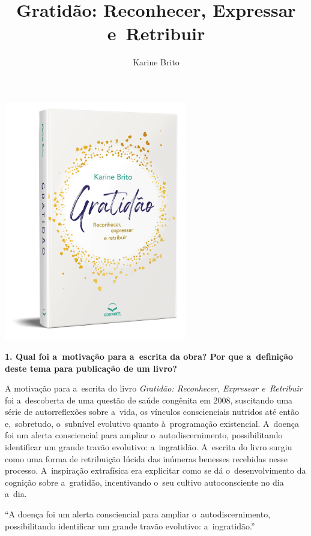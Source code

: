 \documentclass{gescons}
\author{Karine Brito}
\title{Gratidão: Reconhecer, Expressar e~Retribuir}
\begin{document}
    \makeentrevistatitle

    \begin{multicols}{2}

\begin{center}
    \includegraphics[width=8cm]{articles/entrevista/mockups/Karine-Brito}
\end{center}

\textbf{1. Qual foi a~motivação para a~escrita da obra? Por que a~definição deste tema para publicação de um livro?}

A motivação para a~escrita do livro \textit{Gratidão: Reconhecer, Expressar e~Retribuir} foi a~descoberta de uma questão de saúde congênita em 2008, suscitando uma série de autorreflexões sobre a~vida, os vínculos conscienciais nutridos até então e,~sobretudo, o~subnível evolutivo quanto à~programação existencial.  A~doença foi um alerta consciencial para ampliar o~autodiscernimento, possibilitando identificar um grande travão evolutivo: a~ingratidão. A~escrita do livro surgiu como uma forma de retribuição lúcida das inúmeras benesses recebidas nesse processo. A~inspiração extrafísica era explicitar como se dá o~desenvolvimento da cognição sobre a~gratidão, incentivando o~seu cultivo autoconsciente no dia a~dia. 

\begin{pullquote}
``A doença foi um alerta consciencial para ampliar o~autodiscernimento, possibilitando identificar um grande travão evolutivo: a~ingratidão.''
\end{pullquote}


\end{multicols}
\end{document}
